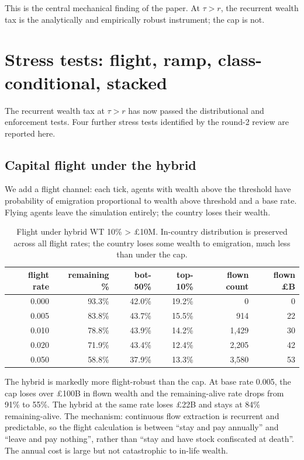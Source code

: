 \documentclass[11pt]{article}
\begin{document}
This is the central mechanical finding of the paper.  At
$\tau > r$, the recurrent wealth tax is the analytically and
empirically robust instrument; the cap is not.

\section{Stress tests: flight, ramp, class-conditional, stacked}
\label{sec:stresstests}

The recurrent wealth tax at $\tau > r$ has now passed the
distributional and enforcement tests.  Four further stress tests
identified by the round-2 review are reported here.

\subsection{Capital flight under the hybrid}

We add a flight channel: each tick, agents with wealth above the
threshold have probability of emigration proportional to wealth
above threshold and a base rate.  Flying agents leave the
simulation entirely; the country loses their wealth.

\begin{table}[h]
\centering
\small
\caption{Flight under hybrid WT 10\% > \pounds 10M.  In-country
distribution is preserved across all flight rates; the country
loses some wealth to emigration, much less than under the cap.}
\label{tab:flight}
\begin{tabular}{rrrrrr}
\toprule
flight rate & remaining \% & bot-50\% & top-10\% & flown count & flown \pounds B \\
\midrule
0.000 & 93.3\% & 42.0\% & 19.2\% &     0 &   0 \\
0.005 & 83.8\% & 43.7\% & 15.5\% &   914 &  22 \\
0.010 & 78.8\% & 43.9\% & 14.2\% & 1{,}429 &  30 \\
0.020 & 71.9\% & 43.4\% & 12.4\% & 2{,}205 &  42 \\
0.050 & 58.8\% & 37.9\% & 13.3\% & 3{,}580 &  53 \\
\bottomrule
\end{tabular}
\end{table}

The hybrid is markedly more flight-robust than the cap.  At base
rate 0.005, the cap loses over \pounds 100B in flown wealth and
the remaining-alive rate drops from 91\% to 55\%.  The hybrid at
the same rate loses \pounds 22B and stays at 84\%
remaining-alive.  The mechanism: continuous flow extraction is
recurrent and predictable, so the flight calculation is between
``stay and pay annually'' and ``leave and pay nothing'', rather
than ``stay and have stock confiscated at death''.  The annual
cost is large but not catastrophic to in-life wealth.
\end{document}
